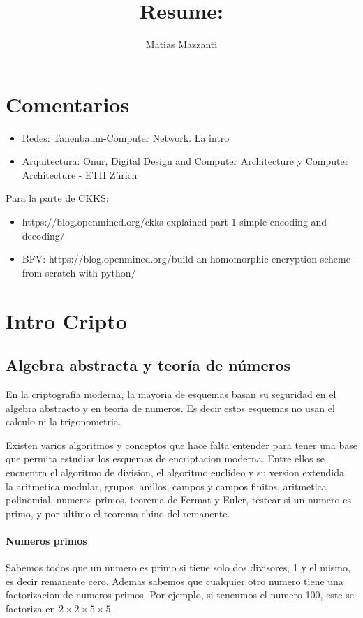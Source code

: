 \documentclass[12pt, oneside]{article}
\title{Resume: }
\author{Matias Mazzanti}
\date{}
\begin{document}
\maketitle
\tableofcontents

\vspace{.25in}
\section{Comentarios}
\begin{itemize}
  \item Redes: Tanenbaum-Computer Network. La intro
  \item Arquitectura: Onur, Digital Design and Computer Architecture y Computer Architecture - ETH Zürich
\end{itemize}

Para la parte de CKKS:
\begin{itemize}
  \item https://blog.openmined.org/ckks-explained-part-1-simple-encoding-and-decoding/
  \item BFV: https://blog.openmined.org/build-an-homomorphic-encryption-scheme-from-scratch-with-python/
\end{itemize}
\section{Intro Cripto}

\subsection{Algebra abstracta y teoría de números}
En la criptografia moderna, la mayoria de esquemas basan su seguridad en
el algebra abstracto y en teoria de numeros.
Es decir estos esquemas no usan el calculo ni la trigonometria.

Existen varios algoritmos y conceptos que hace falta entender para tener una base que permita
estudiar los esquemas de encriptacion moderna.
Entre ellos se encuentra el algoritmo de division, el algoritmo euclideo y su version
extendida, la aritmetica modular, grupos, anillos, campos y campos finitos,
aritmetica polinomial, numeros primos, teorema de Fermat y Euler, testear si un numero es primo,
 y por ultimo el teorema chino del remanente.

 \paragraph{Numeros primos}
Sabemos todos que un numero es primo si tiene solo dos divisores, 1 y el mismo, es decir remanente cero.
Ademas sabemos que cualquier otro numero tiene una factorizacion de numeros primos.
Por ejemplo, si tenenmos el numero 100, este se factoriza en $2\times2\times5\times5$.
\end{document}
